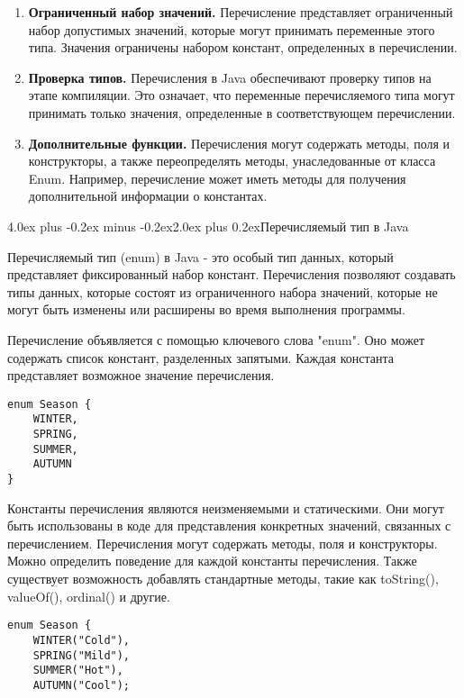 \documentclass[12pt, a4paper]{book}%
\makeatletter
\renewcommand{\section}{\@startsection{section}{1}{1pt}%
{4.0ex plus -0.2ex minus -0.2ex}{2.0ex plus 0.2ex}{\centering\bf}}%
\makeatother
\begin{document}
{\begin{enumerate}
\item {\bf Ограниченный набор значений.}
Перечисление представляет ограниченный набор допустимых значений, которые могут принимать переменные этого типа. Значения ограничены набором констант, определенных в перечислении.

\item {\bf Проверка типов.}
Перечисления в Java обеспечивают проверку типов на этапе компиляции. Это означает, что переменные перечисляемого типа могут принимать только значения, определенные в соответствующем перечислении.

\item {\bf Дополнительные функции.}
 Перечисления могут содержать методы, поля и конструкторы, а также переопределять методы, унаследованные от класса Enum. Например, перечисление может иметь методы для получения дополнительной информации о константах.

\end{enumerate}

\section{Перечисляемый тип в Java}

Перечисляемый тип (enum) в Java - это особый тип данных, который представляет фиксированный набор констант. Перечисления позволяют создавать типы данных, которые состоят из ограниченного набора значений, которые не могут быть изменены или расширены во время выполнения программы.

Перечисление объявляется с помощью ключевого слова "enum". Оно может содержать список констант, разделенных запятыми. Каждая константа представляет возможное значение перечисления.

\begin{lstlisting}
enum Season {
    WINTER,
    SPRING,
    SUMMER,
    AUTUMN
}
\end{lstlisting}

 Константы перечисления являются неизменяемыми и статическими. Они могут быть использованы в коде для представления конкретных значений, связанных с перечислением. Перечисления могут содержать методы, поля и конструкторы. Можно определить поведение для каждой константы перечисления. Также существует возможность добавлять стандартные методы, такие как toString(), valueOf(), ordinal() и другие.

 \begin{lstlisting}
enum Season {
    WINTER("Cold"),
    SPRING("Mild"),
    SUMMER("Hot"),
    AUTUMN("Cool");


\end{lstlisting}}
\end{document}
